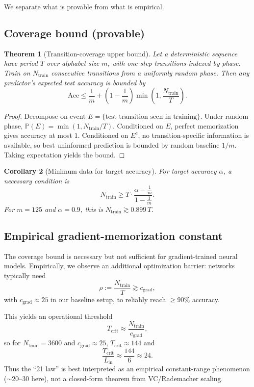 \documentclass[11pt]{article}
\theoremstyle{plain}
\newtheorem{theorem}{Theorem}[section]
\newtheorem{corollary}[theorem]{Corollary}
\theoremstyle{definition}
\begin{document}
We separate what is provable from what is empirical.

\subsection{Coverage bound (provable)}

\begin{theorem}[Transition-coverage upper bound]
\label{thm:sample_complexity}
Let a deterministic sequence have period $T$ over alphabet size $m$, with one-step transitions indexed by phase. Train on $N_{\mathrm{train}}$ consecutive transitions from a uniformly random phase. Then any predictor's expected test accuracy is bounded by
\[
\mathrm{Acc} \le \frac{1}{m} + \left(1-\frac{1}{m}\right)\min\!\left(1,\frac{N_{\mathrm{train}}}{T}\right).
\]
\end{theorem}

\begin{proof}
Decompose on event $E=\{\text{test transition seen in training}\}$. Under random phase, $\mathbb{P}(E)=\min(1,N_{\mathrm{train}}/T)$. Conditioned on $E$, perfect memorization gives accuracy at most $1$. Conditioned on $E^c$, no transition-specific information is available, so best uninformed prediction is bounded by random baseline $1/m$. Taking expectation yields the bound.
\end{proof}

\begin{corollary}[Minimum data for target accuracy]
For target accuracy $\alpha$, a necessary condition is
\[
N_{\mathrm{train}} \ge T\cdot \frac{\alpha-\frac1m}{1-\frac1m}.
\]
For $m=125$ and $\alpha=0.9$, this is $N_{\mathrm{train}}\gtrsim 0.899\,T$.
\end{corollary}

\subsection{Empirical gradient-memorization constant}

The coverage bound is necessary but not sufficient for gradient-trained neural models. Empirically, we observe an additional optimization barrier: networks typically need
\[
\rho:=\frac{N_{\mathrm{train}}}{T}\gtrsim c_{\mathrm{grad}},
\]
with $c_{\mathrm{grad}}\approx 25$ in our baseline setup, to reliably reach $\ge 90\%$ accuracy.

This yields an operational threshold
\[
\boxed{T_{\mathrm{crit}} \approx \frac{N_{\mathrm{train}}}{c_{\mathrm{grad}}}},
\]
so for $N_{\mathrm{train}}=3600$ and $c_{\mathrm{grad}}\approx 25$, $T_{\mathrm{crit}}\approx 144$ and
\[
\frac{T_{\mathrm{crit}}}{L_{\mathrm{in}}}\approx \frac{144}{6}\approx 24.
\]
Thus the ``21 law'' is best interpreted as an empirical constant-range phenomenon ($\sim 20$--$30$ here), not a closed-form theorem from VC/Rademacher scaling.
\end{document}
